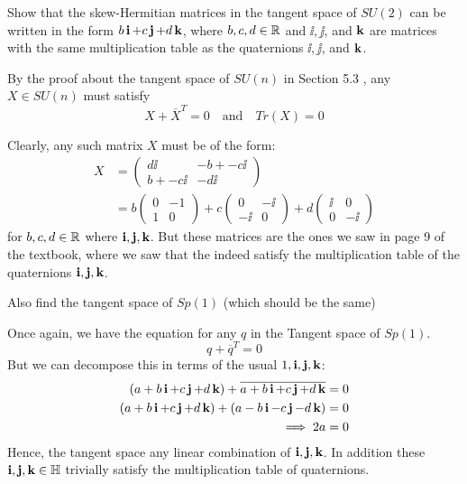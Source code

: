 \documentclass[12pt,onecolumn]{article}
\begin{document}
\begin{exercise}
Show that the skew-Hermitian matrices in the tangent space of $SU(2)$ can be written in the form $b\operatorname{\textbf{i}}+c\operatorname{\textbf{j}}+d\operatorname{\textbf{k}}$, where $b,c,d \in \operatorname{\mathbb{R}}$ and $\ii, \jj$, and $\operatorname{\textbf{k}}$ are matrices with the same multiplication table as the quaternions $\ii, \jj$, and $\operatorname{\textbf{k}}$.
\end{exercise}
\begin{answer}
By the proof about the tangent space of $SU(n)$ in Section 5.3 , any $X \in SU(n)$ must satisfy
$$  X + \overline{X}^T = 0 \quad \text{and} \quad Tr(X) = 0$$

Clearly, any such matrix $X$ must be of the form:
\begin{align*}
    X &= \begin{pmatrix} d\ii & -b + -c\ii \\ b + -c\ii & -d\ii \end{pmatrix} \\
    &= b \begin{pmatrix} 0 & -1 \\ 1 & 0 \end{pmatrix} + c \begin{pmatrix} 0 & -\ii \\ -\ii & 0 \end{pmatrix} + d \begin{pmatrix} \ii & 0 \\ 0 & -\ii \end{pmatrix}
\end{align*}
for $b,c,d \in \operatorname{\mathbb{R}}$ where $\operatorname{\textbf{i}},\operatorname{\textbf{j}},\operatorname{\textbf{k}}$. But these matrices are the ones we saw in page 9 of the textbook, where we saw that the indeed satisfy the multiplication table of the quaternions $\operatorname{\textbf{i}}, \operatorname{\textbf{j}}, \operatorname{\textbf{k}}$.
\end{answer}
\begin{exercise}
Also find the tangent space of $Sp(1)$ (which should be the same)
\end{exercise}
\begin{answer}
Once again, we have the equation for any $q$ in the Tangent space of $Sp(1)$.
$$ q + \overline{q}^T = 0$$
But we can decompose this in terms of the usual $1, \operatorname{\textbf{i}},\operatorname{\textbf{j}},\operatorname{\textbf{k}}$:
\begin{align*}
    (a + b\operatorname{\textbf{i}} + c\operatorname{\textbf{j}} + d\operatorname{\textbf{k}}) + \overline{a + b\operatorname{\textbf{i}} + c\operatorname{\textbf{j}} + d\operatorname{\textbf{k}}} &= 0 \\
    (a+b\operatorname{\textbf{i}} + c\operatorname{\textbf{j}} +d\operatorname{\textbf{k}}) + (a-b\operatorname{\textbf{i}} -c\operatorname{\textbf{j}}-d\operatorname{\textbf{k}}) &= 0\\
    \implies 2a &= 0\\
\end{align*}
Hence, the tangent space any linear combination of $\operatorname{\textbf{i}},\operatorname{\textbf{j}},\operatorname{\textbf{k}}$. In addition these $\operatorname{\textbf{i}},\operatorname{\textbf{j}},\operatorname{\textbf{k}} \in \mathbb{H}$ trivially satisfy the multiplication table of quaternions.
\end{answer}
\end{document}
